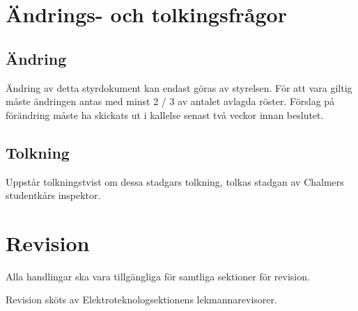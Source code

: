 \documentclass{article}
\begin{document}
\section{Ändrings- och tolkingsfrågor}
\subsection{Ändring}
Ändring av detta styrdokument kan endast göras av styrelsen. För att vara giltig måste ändringen antas med minst 2 / 3 av antalet avlagda röster. Förslag på förändring måste ha skickats ut i kallelse senast två veckor innan beslutet.

\subsection{Tolkning}
Uppstår tolkningstvist om dessa stadgars tolkning, tolkas stadgan av Chalmers studentkårs inspektor.

\section{Revision}
Alla handlingar ska vara tillgängliga för samtliga sektioner för revision.

Revision sköts av Elektroteknologsektionens lekmannarevisorer.
\end{document}
